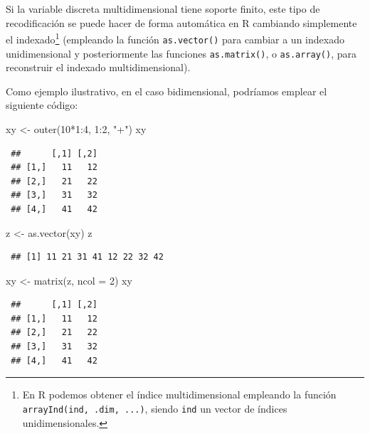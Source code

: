 \documentclass[
  10pt,
]{book}
\newenvironment{Shaded}{\begin{snugshade}}{\end{snugshade}}
\newcommand{\AttributeTok}[1]{\textcolor[rgb]{0.77,0.63,0.00}{#1}}
\newcommand{\DecValTok}[1]{\textcolor[rgb]{0.00,0.00,0.81}{#1}}
\newcommand{\FunctionTok}[1]{\textcolor[rgb]{0.00,0.00,0.00}{#1}}
\newcommand{\NormalTok}[1]{#1}
\newcommand{\OtherTok}[1]{\textcolor[rgb]{0.56,0.35,0.01}{#1}}
\newcommand{\SpecialCharTok}[1]{\textcolor[rgb]{0.00,0.00,0.00}{#1}}
\newcommand{\StringTok}[1]{\textcolor[rgb]{0.31,0.60,0.02}{#1}}
\theoremstyle{break}
\theoremstyle{nonumberplain}
\let\oldfootnote\footnote
\renewcommand\footnote[1]{\oldfootnote{\hspace{2mm}#1}}
\begin{document}
Si la variable discreta multidimensional tiene soporte finito, este tipo de recodificación se puede hacer de forma automática en R cambiando simplemente el indexado\footnote{En R podemos obtener el índice multidimensional empleando la función \texttt{arrayInd(ind,\ .dim,\ ...)}, siendo \texttt{ind} un vector de índices unidimensionales.} (empleando la función \texttt{as.vector()} para cambiar a un indexado unidimensional y posteriormente las funciones \texttt{as.matrix()}, o \texttt{as.array()}, para reconstruir el indexado multidimensional).

Como ejemplo ilustrativo, en el caso bidimensional, podríamos emplear el siguiente código:

\begin{Shaded}
\begin{Highlighting}[]
\NormalTok{xy }\OtherTok{\textless{}{-}} \FunctionTok{outer}\NormalTok{(}\DecValTok{10}\SpecialCharTok{*}\DecValTok{1}\SpecialCharTok{:}\DecValTok{4}\NormalTok{, }\DecValTok{1}\SpecialCharTok{:}\DecValTok{2}\NormalTok{, }\StringTok{"+"}\NormalTok{)}
\NormalTok{xy}
\end{Highlighting}
\end{Shaded}

\begin{verbatim}
 ##      [,1] [,2]
 ## [1,]   11   12
 ## [2,]   21   22
 ## [3,]   31   32
 ## [4,]   41   42
\end{verbatim}

\begin{Shaded}
\begin{Highlighting}[]
\NormalTok{z }\OtherTok{\textless{}{-}} \FunctionTok{as.vector}\NormalTok{(xy)}
\NormalTok{z}
\end{Highlighting}
\end{Shaded}

\begin{verbatim}
 ## [1] 11 21 31 41 12 22 32 42
\end{verbatim}

\begin{Shaded}
\begin{Highlighting}[]
\NormalTok{xy }\OtherTok{\textless{}{-}} \FunctionTok{matrix}\NormalTok{(z, }\AttributeTok{ncol =} \DecValTok{2}\NormalTok{)}
\NormalTok{xy}
\end{Highlighting}
\end{Shaded}

\begin{verbatim}
 ##      [,1] [,2]
 ## [1,]   11   12
 ## [2,]   21   22
 ## [3,]   31   32
 ## [4,]   41   42
\end{verbatim}
\end{document}
